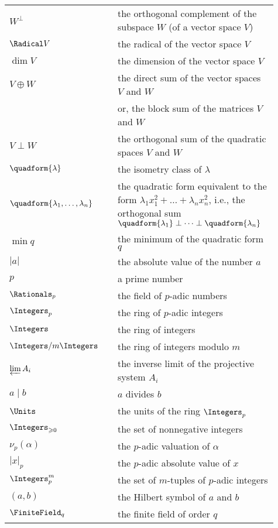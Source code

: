 \begin{longtable}{p{0.25\linewidth} p{0.01\linewidth} p{0.65\linewidth}}
    \(W^{\perp}\) && the orthogonal complement of the subspace \(W\) (of a
    vector space \(V\))\\
    \(\Radical V\) && the radical of the vector space \(V\)\\
    \(\dim V\) && the dimension of the vector space \(V\)\\
    \(V \oplus W\) && the direct sum of the vector spaces \(V\) and \(W\)\\
    && or, the block sum of the matrices \(V\) and \(W\)\\
    \(V \perp W\) && the orthogonal sum of the quadratic spaces \(V\) and \(W\)\\
    \(\quadform{\lambda}\) && the isometry class of \(\lambda\)\\
    \(\quadform{\lambda_1, \dots, \lambda_n}\) && the quadratic form equivalent
    to the form \(\lambda_1 x_1^2 + \dots + \lambda_n x_n^2\), i.e., the
    orthogonal sum \(\quadform{\lambda_1} \perp \dots \perp
    \quadform{\lambda_n}\)\\
    \(\min q\) && the minimum of the quadratic form \(q\)\\
    \(|a|\) && the absolute value of the number \(a\)\\
    \(p\) && a prime number\\
    \(\Rationals_p\) && the field of \(p\)-adic numbers\\
    \(\Integers_p\) && the ring of \(p\)-adic integers\\
    \(\Integers\) && the ring of integers\\
    \(\Integers/m\Integers\) && the ring of integers modulo \(m\)\\
    \(\varprojlim A_i\) && the inverse limit of the projective system \(A_i\)\\
    \(a \mid b\) && \(a\) divides \(b\)\\
    \(\Units\) && the units of the ring \(\Integers_p\)\\
    \(\Integers_{\geq 0}\) && the set of nonnegative integers\\
    \(\nu_p(\alpha)\) && the \(p\)-adic valuation of \(\alpha\)\\
    \(|x|_p\) && the \(p\)-adic absolute value of \(x\)\\
    \(\Integers_p^m\) && the set of \(m\)-tuples of \(p\)-adic integers\\
    \((a, b)\) && the Hilbert symbol of \(a\) and \(b\)\\
    \(\FiniteField_q\) && the finite field of order \(q\)\\

\end{longtable}
